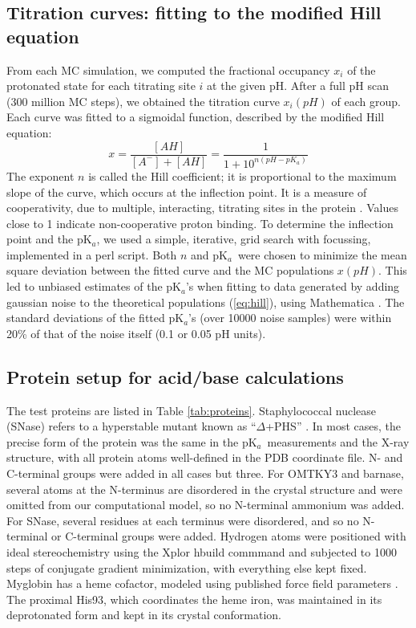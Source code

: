 \documentclass[a4paper,12pt]{article}
\newcommand{\pk}{pK$_a$}
\begin{document}
\subsection{Titration curves: fitting to the modified Hill equation}
From each MC simulation, we computed the fractional occupancy $x_i$ of the protonated state for each titrating site
$i$ at the given pH. After a full pH scan (300 million MC steps), we obtained the titration curve $x_i(pH)$  of each
group. Each curve was fitted to a sigmoidal function, described by the modified Hill equation: 
\begin{equation} \label{eq:hill}
x=\frac{[AH]}{[A^-]+[AH]}=\frac{1}{1+10^{n(pH - pK_a)}} 
\end{equation}
The exponent $n$ is called the Hill coefficient; it is proportional to the maximum slope of the curve, which occurs
at the inflection point. It is a measure of cooperativity, due to multiple, interacting, titrating sites in the protein
\cite{Onufriev01}. Values close to 1 indicate non-cooperative proton binding. To determine the inflection point and the
\pk, we used a simple, iterative, grid search with focussing, implemented in a perl script. Both $n$ and \pk\ were chosen
to minimize the mean square deviation between the fitted curve and the MC populations $x(pH)$. This led to unbiased
estimates of the \pk's when fitting to data generated by adding gaussian noise to the theoretical populations (\ref{eq:hill}),
using Mathematica \cite{MMA}. The standard deviations of the fitted \pk's (over 10000 noise samples) were within 20\% of
that of the noise itself (0.1 or 0.05 pH units). 

\subsection{Protein setup for acid/base calculations}
The test proteins are listed in Table \ref{tab:proteins}. Staphylococcal nuclease (SNase) refers to a hyperstable mutant
known as ``$\Delta$+PHS'' \cite{Castaneda09}. In most cases, the precise form of the protein was the same in the \pk\ 
measurements and the X-ray structure, with all protein atoms well-defined in the PDB coordinate file. N- and C-terminal
groups were added in all cases but three. For OMTKY3 and barnase, several atoms at the N-terminus are disordered in the
crystal structure and were omitted from our computational model, so no N-terminal ammonium was added. For SNase, several
residues at each terminus were disordered, and so no N-terminal or C-terminal groups were added. Hydrogen atoms were
positioned with ideal stereochemistry using the Xplor hbuild commmand and subjected to 1000 steps of conjugate gradient
minimization, with everything else kept fixed. Myglobin has a heme cofactor, modeled using published force field parameters
\cite{Giamonna84}. The proximal His93, which coordinates the heme iron, was maintained in its deprotonated form and kept
in its crystal conformation.
\end{document}
